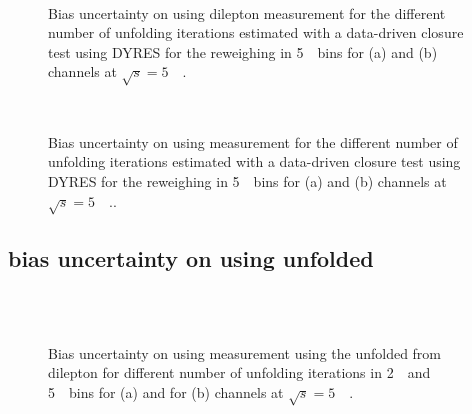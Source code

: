 \begin{figure}[h]
\centering
{}
\\
\caption{Bias uncertainty on \ptz using dilepton \pt measurement for the different number of unfolding iterations estimated with a data-driven closure test using DYRES for the reweighing in 5~\GeV\ bins for \Zee (a) and \Zmm (b) channels at $\sqrt{s} = 5$~\TeV\ .}
\label{fig:DYTurboNNL_bias_Histmaker02_pt_5_5GeV}
\end{figure}
\begin{figure}[h]
\centering
{}
\\
\caption{Bias uncertainty on \ptz using \ut measurement for the different number of unfolding iterations estimated with a data-driven closure test using DYRES for the reweighing in 5~\GeV\ bins for \Zee (a) and \Zmm (b) channels at $\sqrt{s} = 5$~\TeV\ .. }
\label{fig:DYTurboNNL_bias_Histmaker02_ut_5_5GeV}
\end{figure}

\clearpage
\subsection{bias uncertainty on \ut using unfolded \ptz}
\label{subsec:bias_ut_unfoldzpt}
\begin{figure}[h]
\centering
{}
\\
\\
\caption{Bias uncertainty on \ptz using \ut measurement using the unfolded \ptz from dilepton \pt for different number of unfolding iterations in 2~\GeV\ and 5~\GeV\ bins for \Zee (a) and for \Zmm (b) channels at $\sqrt{s} = 5$~\TeV\ .}
\label{fig:bias_unfoldzpt_5}
\end{figure}

